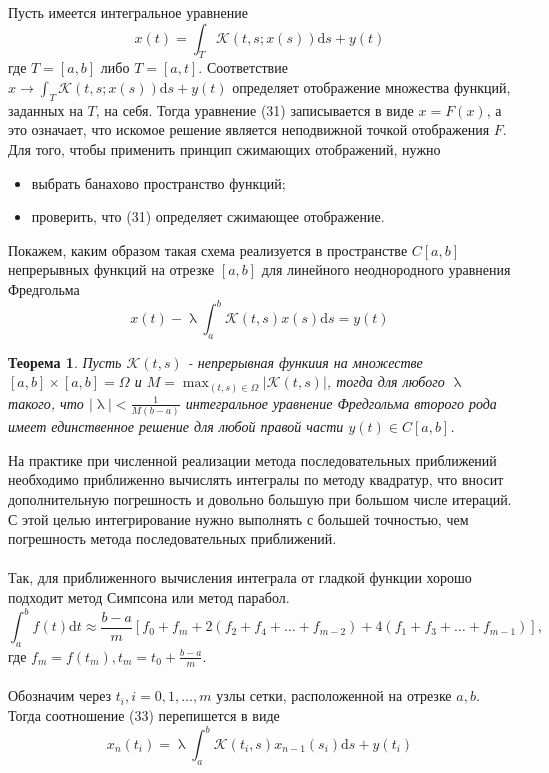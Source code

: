 \documentclass[a4paper, 12pt]{report}
\renewcommand{\lambda}{\uplambda}
\newtheorem*{theorem}{Теорема}
\begin{document}
		Пусть имеется интегральное уравнение
		$$
		x(t)=\int_{T} \mathcal{K}(t, s ; x(s)) \mathrm{d} s+y(t)
		$$
		где $T=[a, b]$ либо $T=[a, t]$. Соответствие $x \rightarrow \int_{T} \mathcal{K}(t, s ; x(s)) \mathrm{d} s+y(t)$ определяет отображение множества функций, заданных на $T$, на себя. Тогда уравнение (31) записывается в виде $x=F(x)$, а это означает, что искомое решение является неподвижной точкой отображения $F$. Для того, чтобы применить принцип сжимающих отображений, нужно\begin{itemize}
			\item выбрать банахово пространство функций;
			\item проверить, что (31) определяет сжимающее отображение.
		\end{itemize}
		Покажем, каким образом такая схема реализуется в пространстве $C[a, b]$ непрерывных функций на отрезке $[a, b]$ для линейного неоднородного уравнения Фредгольма
		$$
		x(t)-\lambda \int_{a}^{b} \mathcal{K}(t, s) x(s) \mathrm{d} s=y(t)
		$$
		\begin{theorem}
			 Пусть $\mathcal{K}(t, s)$ - непрерывная функиия на множестве $[a, b] \times[a, b]=\Omega$ и $M=\max _{(t, s) \in \Omega}|\mathcal{K}(t, s)|$, тогда для любого $\lambda$ такого, что $|\lambda|<\frac{1}{M(b-a)}$ интегральное уравнение Фредгольма второго рода имеет единственное решение для любой правой части $y(t) \in C[a, b]$. 
		\end{theorem}
		На практике при численной реализации метода последовательных приближений необходимо приближенно вычислять интегралы по методу квадратур, что вносит дополнительную погрешность и довольно большую при большом числе итераций. С этой целью интегрирование нужно выполнять с большей точностью, чем погрешность метода последовательных приближений.\\\\
		Так, для приближенного вычисления интеграла от гладкой функции хорошо подходит метод Симпсона или метод парабол.
		$$\int_{a}^{b} f(t) \mathrm{d} t \approx \frac{b-a}{m}\left[f_{0}+f_{m}+2\left(f_{2}+f_{4}+\ldots+f_{m-2}\right)+4\left(f_{1}+f_{3}+\ldots+f_{m-1}\right)\right],$$ где $f_{m}=f\left(t_{m}\right), t_{m}=t_{0}+\frac{b-a}{m}$.\\\\
		Обозначим через $t_{i}, i=0,1, \ldots, m$ узлы сетки, расположенной на отрезке $a, b$. Тогда соотношение (33) перепишется в виде
		$$
		x_{n}\left(t_{i}\right)=\lambda \int_{a}^{b} \mathcal{K}\left(t_{i}, s\right) x_{n-1}\left(s_{i}\right) \mathrm{d} s+y\left(t_{i}\right)
		$$
\end{document}
